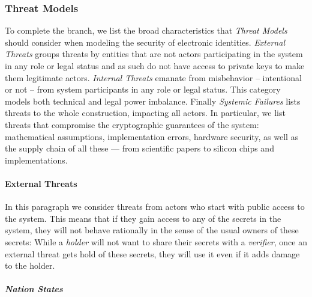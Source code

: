 \subsubsection{Threat Models}
\label{subsub:threat_models}

To complete the \emph{\rot} branch, we list the broad characteristics that \emph{Threat Models} should consider when modeling the security of electronic identities.
\emph{External Threats} groups threats by entities that are not actors participating in the system in any role or legal status and as such do not have access to private keys to make them legitimate actors.
\emph{Internal Threats} emanate from misbehavior -- intentional or not -- from system participants in any role or legal status. This category models both technical and legal power imbalance.
Finally \emph{Systemic Failures} lists threats to the whole construction, impacting all actors. In particular, we list threats that compromise the cryptographic guarantees of the system: mathematical assumptions, implementation errors, hardware security, as well as the supply chain of all these --- from scientific papers to silicon chips and implementations.

\vspace{1em}



\paragraph{External Threats}

In this paragraph we consider threats from actors who start with public access
to the system.
This means that if they gain access to any of the secrets in the system, they will
not behave rationally in the sense of the usual owners of these secrets:
While a \emph{holder} will not want to share their secrets with a \emph{verifier},
once an external threat gets hold of these secrets, they will use it even if it adds
damage to the holder.

\subparagraph{Nation States}
\label{subp:nation_state}

